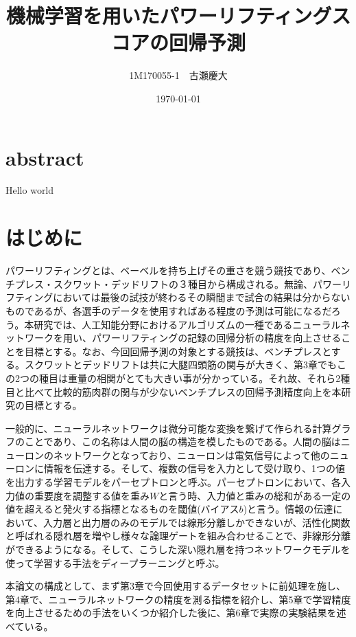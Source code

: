 \documentclass{article}
\title{機械学習を用いたパワーリフティングスコアの回帰予測}
\author{1M170055-1　古瀬慶大 }
\date{\today}
\begin{document}
\maketitle

\newpage

\section{abstract}
Hello world


\newpage
\tableofcontents


\newpage
\section{はじめに}
パワーリフティングとは、ベーベルを持ち上げその重さを競う競技であり、ベンチプレス・スクワット・デッドリフトの３種目から構成される。無論、パワーリフティングにおいては最後の試技が終わるその瞬間まで試合の結果は分からないものであるが、各選手のデータを使用すればある程度の予測は可能になるだろう。本研究では、人工知能分野におけるアルゴリズムの一種であるニューラルネットワークを用い、パワーリフティングの記録の回帰分析の精度を向上させることを目標とする。なお、今回回帰予測の対象とする競技は、ベンチプレスとする。スクワットとデッドリフトは共に大腿四頭筋の関与が大きく、第3章でもこの2つの種目は重量の相関がとても大きい事が分かっている。それ故、それら2種目と比べて比較的筋肉群の関与が少ないベンチプレスの回帰予測精度向上を本研究の目標とする。

一般的に、ニューラルネットワークは微分可能な変換を繋げて作られる計算グラフのことであり、この名称は人間の脳の構造を模したものである。人間の脳はニューロンのネットワークとなっており、ニューロンは電気信号によって他のニューロンに情報を伝達する。そして、複数の信号を入力として受け取り、1つの値を出力する学習モデルをパーセプトロンと呼ぶ。パーセプトロンにおいて、各入力値の重要度を調整する値を重み\begin{math}W\end{math}と言う時、入力値と重みの総和がある一定の値を超えると発火する指標となるものを閾値(バイアス\begin{math}b\end{math})と言う。情報の伝達において、入力層と出力層のみのモデルでは線形分離しかできないが、活性化関数と呼ばれる隠れ層を増やし様々な論理ゲートを組み合わせることで、非線形分離ができるようになる。そして、こうした深い隠れ層を持つネットワークモデルを使って学習する手法をディープラーニングと呼ぶ。

本論文の構成として、まず第3章で今回使用するデータセットに前処理を施し、第4章で、ニューラルネットワークの精度を測る指標を紹介し、第5章で学習精度を向上させるための手法をいくつか紹介した後に、第6章で実際の実験結果を述べている。
\end{document}
